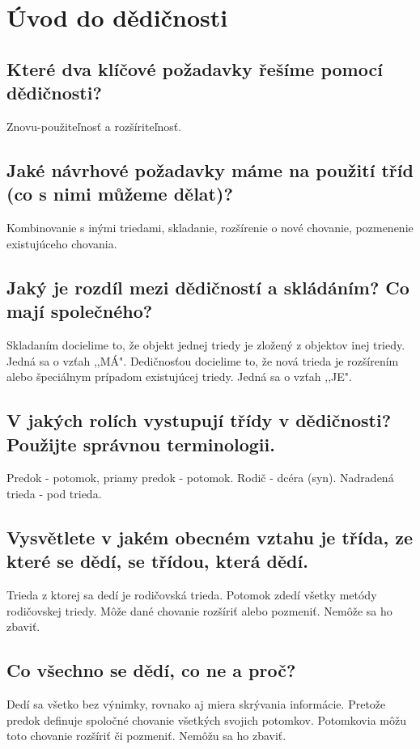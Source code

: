 \section{Úvod do dědičnosti}

\subsection{Které dva klíčové požadavky řešíme pomocí dědičnosti?}
Znovu-použiteľnosť a rozšíriteľnosť.

\subsection{Jaké návrhové požadavky máme na použití tříd (co s nimi můžeme dělat)?}
Kombinovanie s inými triedami, skladanie, rozšírenie o nové chovanie, pozmenenie existujúceho chovania.

\subsection{Jaký je rozdíl mezi dědičností a skládáním? Co mají společného?}
Skladaním docielime to, že objekt jednej triedy je zložený z objektov inej triedy. Jedná sa o vzťah ,,MÁ".\newline
Dedičnosťou docielime to, že nová trieda je rozšírením alebo špeciálnym prípadom existujúcej triedy. Jedná sa o vzťah ,,JE".

\subsection{V jakých rolích vystupují třídy v dědičnosti? Použijte správnou terminologii.}
Predok - potomok, priamy predok - potomok. Rodič - dcéra (syn). Nadradená trieda - pod trieda.

\subsection{Vysvětlete v jakém obecném vztahu je třída, ze které se dědí, se třídou, která dědí.}
Trieda z ktorej sa dedí je rodičovská trieda. Potomok zdedí všetky metódy rodičovskej triedy. Môže dané chovanie rozšíriť alebo pozmeniť. Nemôže sa ho zbaviť.

\subsection{Co všechno se dědí, co ne a proč?}
Dedí sa všetko bez výnimky, rovnako aj miera skrývania informácie. Pretože predok definuje spoločné chovanie všetkých svojich potomkov. Potomkovia môžu toto chovanie rozšíriť či pozmeniť. Nemôžu sa ho zbaviť.

